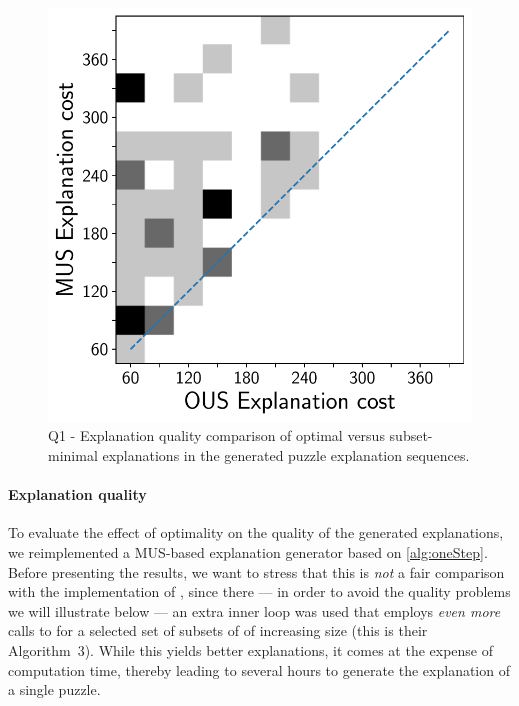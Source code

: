 \begin{figure}[t]
  \centering
  \includegraphics[width=0.6\columnwidth]{figures_post_paper/heatmap_costs_mus_cous.pdf}
  \caption{Q1 - Explanation quality comparison of optimal versus subset-minimal explanations in the generated puzzle explanation sequences.}
  \label{fig:rq1_heatmap}
\end{figure}


\paragraph{Explanation quality}\label{paragraph:explanationquality}
To evaluate the effect of optimality on the quality of the generated explanations, we reimplemented a MUS-based explanation generator based on \cref{alg:oneStep}. 
Before presenting the results, we want to stress that this is \emph{not} a fair comparison with the implementation of \citet{ecai/BogaertsGCG20}, since there --- in order to avoid the quality problems we will illustrate below ---  an extra inner loop was used that employs \emph{even more} calls to  for a selected set of subsets of \formulac of increasing size (this is their Algorithm~3). 
While this yields better explanations, it comes at the expense of computation time, thereby leading to several hours to generate the explanation of a single puzzle. 

